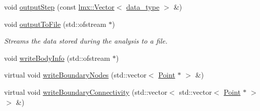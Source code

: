 \begin{DoxyCompactItemize}
\item 
void \hyperlink{classmknix_1_1_rigid_body_a605ed074fed7570c6620a6a6f6cd4bb0}{output\+Step} (const \hyperlink{classlmx_1_1_vector}{lmx\+::\+Vector}$<$ \hyperlink{namespacemknix_a16be4b246fbf2cceb141e3a179111020}{data\+\_\+type} $>$ \&)
\item 
void \hyperlink{classmknix_1_1_rigid_body_a0b0df6ee53217187a301f224b8fe0d92}{output\+To\+File} (std\+::ofstream $\ast$)
\begin{DoxyCompactList}\small\item\em Streams the data stored during the analysis to a file. \end{DoxyCompactList}\item 
void \hyperlink{classmknix_1_1_rigid_body_aec0efdaa5c27b8e1611af7c9f047497a}{write\+Body\+Info} (std\+::ofstream $\ast$)
\item 
virtual void \hyperlink{classmknix_1_1_rigid_body_a82d8d5b7abc4218fcab65e7f0dc266d8}{write\+Boundary\+Nodes} (std\+::vector$<$ \hyperlink{classmknix_1_1_point}{Point} $\ast$ $>$ \&)
\item 
virtual void \hyperlink{classmknix_1_1_rigid_body_a127f3394edf38438e794bfed1a6ce0d8}{write\+Boundary\+Connectivity} (std\+::vector$<$ std\+::vector$<$ \hyperlink{classmknix_1_1_point}{Point} $\ast$ $>$ $>$ \&)
\end{DoxyCompactItemize}
